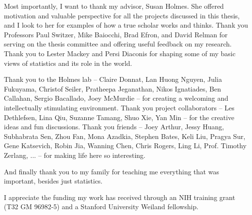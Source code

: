 
Most importantly, I want to thank my advisor, Susan Holmes. She offered
motivation and valuable perspective for all the projects discussed in this
thesis, and I look to her for examples of how a true scholar works and thinks.
Thank you Professors Paul Switzer, Mike Baiocchi, Brad Efron, and David Relman
for serving on the thesis committee and offering useful feedback on my research.
Thank you to Lester Mackey and Persi Diaconis for shaping some of my basic views
of statistics and its role in the world.

Thank you to the Holmes lab -- Claire Donnat, Lan Huong Nguyen, Julia Fukuyama,
Christof Seiler, Pratheepa Jeganathan, Nikos Ignatiades, Ben Callahan, Sergio
Bacallado, Joey McMurdie -- for creating a welcoming and intellectually
stimulating environment. Thank you project collaborators -- Les Dethlefsen, Lina
Qiu, Suzanne Tamang, Shuo Xie, Yan Min -- for the creative ideas and fun
discussions. Thank you friends -- Joey Arthur, Jessy Huang, Subhabrata Sen, Zhou
Fan, Mona Azadkia, Stephen Bates, Keli Liu, Pragya Sur, Gene Katsevich, Robin
Jia, Wanning Chen, Chris Rogers, Ling Li, Prof. Timothy Zerlang, ... -- for
making life here so interesting.

And finally thank you to my family for teaching me everything that was
important, besides just statistics.

I appreciate the funding my work has received through an NIH training grant (T32
GM 96982-5) and a Stanford University Weiland fellowship.
